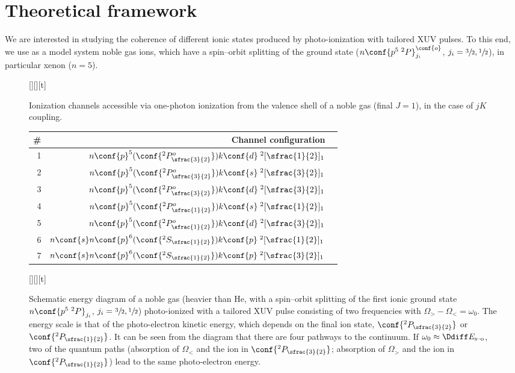 \section{Theoretical framework}
\label{sec:theoretical-framework}
\noindent We are interested in studying the coherence of different
ionic states produced by photo-ionization with tailored XUV
pulses. To this end, we use as a model system noble gas ions, which
have a spin--orbit splitting of the ground state
(\(n\conf{p^5\;^2P}^\conf{o}_{j_i}\),
\(j_i=\sfrac{3}{2},\sfrac{1}{2}\)), in particular xenon (\(n=5\)).

\begin{figure}[tb]
  \begin{floatrow}
    [\FBwidth][][t]{\caption{\label{tab:ion-channels}
        Ionization channels accessible via one-photon ionization from
        the valence shell of a noble gas (final \(J=1\)), in the case
        of \(jK\) coupling.}}{
      \begin{tabular}{r|rl}
        \# & Channel configuration\\
        \hline
        1 & \(n\conf{p}^5(\conf{^2P^o_{\sfrac{3}{2}}})k\conf{d}\;^2[\sfrac{1}{2}]_{1}\)\Tstrut\\
        2 & \(n\conf{p}^5(\conf{^2P^o_{\sfrac{3}{2}}})k\conf{s}\;^2[\sfrac{3}{2}]_{1}\)\\
        3 & \(n\conf{p}^5(\conf{^2P^o_{\sfrac{3}{2}}})k\conf{d}\;^2[\sfrac{3}{2}]_{1}\)\\
        \hline
        4 & \(n\conf{p}^5(\conf{^2P^o_{\sfrac{1}{2}}})k\conf{s}\;^2[\sfrac{1}{2}]_{1}\)\Tstrut\\
        5 & \(n\conf{p}^5(\conf{^2P^o_{\sfrac{1}{2}}})k\conf{d}\;^2[\sfrac{3}{2}]_{1}\)\\
        \hline
        6 & \(n\conf{s}n\conf{p}^6(\conf{^2S_{\sfrac{1}{2}}})k\conf{p}\;^2[\sfrac{1}{2}]_{1}\)\Tstrut\\
        7 & \(n\conf{s}n\conf{p}^6(\conf{^2S_{\sfrac{1}{2}}})k\conf{p}\;^2[\sfrac{3}{2}]_{1}\)\\
      \end{tabular}}
    [\Xhsize][][t]{\caption{\label{fig:sketch} Schematic
        energy diagram of a noble gas (heavier than He, \ie with a
        spin--orbit splitting of the first ionic ground state
        \(n\conf{p^5\;^2P}_{j_i}\), \(j_i=\sfrac{3}{2},\sfrac{1}{2}\))
        photo-ionized with a tailored XUV pulse consisting of two
        frequencies with \(\Omega_>-\Omega_<=\omega_0\). The energy scale is that of
        the photo-electron kinetic energy, which depends on the final
        ion state, \(\conf{^2P_{\sfrac{3}{2}}}\) or
        \(\conf{^2P_{\sfrac{1}{2}}}\).  It can be seen from the
        diagram that there are four pathways to the continuum. If
        \(\omega_0\approx\Ddiff E_{\textrm{s--o}}\), two of the quantum paths
        (absorption of \(\Omega_<\) and the ion in
        \(\conf{^2P_{\sfrac{3}{2}}}\); absorption of \(\Omega_>\) and the
        ion in \(\conf{^2P_{\sfrac{1}{2}}}\)) lead to the same
        photo-electron energy.}}{}
  \end{floatrow}
\end{figure}
